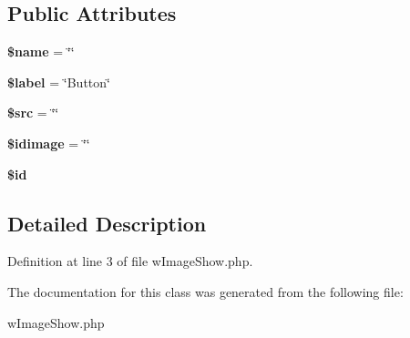 \subsection*{Public Attributes}
\begin{DoxyCompactItemize}
\item 
\hypertarget{classwImageShow_afb4d0cf98aba576ac56f50e0517730ed}{
{\bfseries \$name} = \char`\"{}\char`\"{}}
\label{classwImageShow_afb4d0cf98aba576ac56f50e0517730ed}

\item 
\hypertarget{classwImageShow_af93d61359f89781ebc46ad91a516a936}{
{\bfseries \$label} = \char`\"{}Button\char`\"{}}
\label{classwImageShow_af93d61359f89781ebc46ad91a516a936}

\item 
\hypertarget{classwImageShow_a6045057ad9637a261ea3d99678808ad1}{
{\bfseries \$src} = \char`\"{}\char`\"{}}
\label{classwImageShow_a6045057ad9637a261ea3d99678808ad1}

\item 
\hypertarget{classwImageShow_a006bf986d545395e0d5c2ab9fd1f827a}{
{\bfseries \$idimage} = \char`\"{}\char`\"{}}
\label{classwImageShow_a006bf986d545395e0d5c2ab9fd1f827a}

\item 
\hypertarget{classwImageShow_a627ce93343a7921a52ff2deef3134a26}{
{\bfseries \$id}}
\label{classwImageShow_a627ce93343a7921a52ff2deef3134a26}

\end{DoxyCompactItemize}


\subsection{Detailed Description}


Definition at line 3 of file wImageShow.php.



The documentation for this class was generated from the following file:\begin{DoxyCompactItemize}
\item 
wImageShow.php\end{DoxyCompactItemize}
